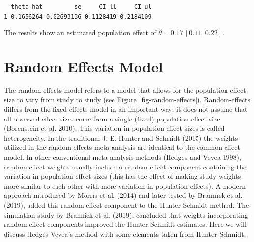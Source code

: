 \documentclass[
  letterpaper,
  DIV=11,
  numbers=noendperiod]{scrreprt}
\newenvironment{Shaded}{}{}
\newcommand{\AttributeTok}[1]{\textcolor[rgb]{0.00,0.34,0.68}{#1}}
\newcommand{\CommentTok}[1]{\textcolor[rgb]{0.54,0.53,0.53}{#1}}
\newcommand{\DecValTok}[1]{\textcolor[rgb]{0.69,0.50,0.00}{#1}}
\newcommand{\FunctionTok}[1]{\textcolor[rgb]{0.39,0.29,0.61}{#1}}
\newcommand{\NormalTok}[1]{\textcolor[rgb]{0.12,0.11,0.11}{#1}}
\newcommand{\SpecialCharTok}[1]{\textcolor[rgb]{0.24,0.68,0.91}{#1}}
\begin{document}
\begin{tcolorbox}
\begin{Shaded}
\end{Shaded}

\begin{verbatim}
  theta_hat         se     CI_ll     CI_ul
1 0.1656264 0.02693136 0.1128419 0.2184109
\end{verbatim}

The results show an estimated population effect of
\(\hat{\theta}=0.17\, [0.11,\, 0.22]\).

\end{tcolorbox}

\section{Random Effects Model}\label{random-effects-model}

The random-effects model refers to a model that allows for the
population effect size to vary from study to study (see
Figure~\ref{fig-random-effects}). Random-effects differs from the fixed
effects model in an important way: it does not assume that all observed
effect sizes come from a single (fixed) population effect size
(Borenstein et al. 2010). This variation in population effect sizes is
called heterogeneity. In the traditional J. E. Hunter and Schmidt (2015)
the weights utilized in the random effects meta-analysis are identical
to the common effect model. In other conventional meta-analysis methods
(Hedges and Vevea 1998), random-effect weights usually include a random
effect component containing the variation in population effect sizes
(this has the effect of making study weights more similar to each other
with more variation in population effects). A modern approach introduced
by Morris et al. (2014) and later tested by Brannick et al. (2019),
added this random effect component to the Hunter-Schmidt method. The
simulation study by Brannick et al. (2019), concluded that weights
incorporating random effect components improved the Hunter-Schmidt
estimates. Here we will discuss Hedges-Vevea's method with some elements
taken from Hunter-Schmidt.
\end{document}
